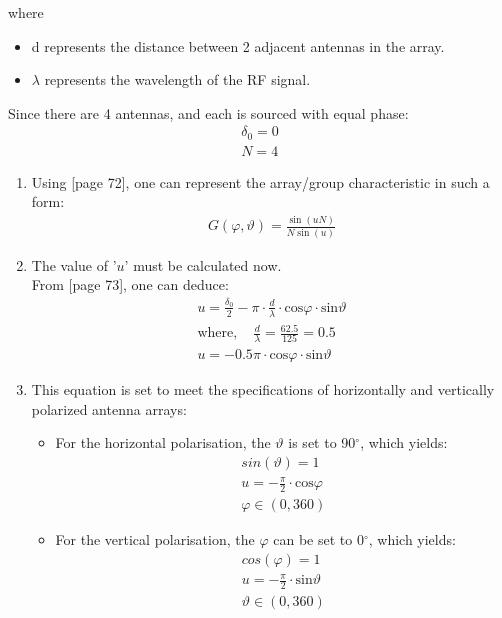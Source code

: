 where\begin{itemize}
	\item d represents the distance between 2 adjacent antennas in the array.
	\item $\lambda$ represents the wavelength of the RF signal.
\end{itemize}
Since there are 4 antennas, and each is sourced with equal phase:
\begin{gather}
	\delta_0=0 \nonumber \\
	N=4	\nonumber
\end{gather}

\begin{enumerate}
	\item Using \cite{lec-script} [page 72], one can represent the array/group characteristic in such a form:
	\begin{gather}
		G(\varphi,\vartheta) = \frac{\sin(uN)}{N\sin(u)} \label{group_char}
	\end{gather}
	
	\item The value of '$u$' must be calculated now.\\ From \cite{lec-script} [page 73], one can deduce:
	\begin{gather}
		u = \frac{\delta_0}{2} - \pi\cdot\frac{d}{\lambda}\cdot\mathrm{cos}\varphi\cdot\mathrm{sin}\vartheta \nonumber \\
		\mathrm{where,}\quad
		\frac{d}{\lambda}=\frac{62.5}{125}=0.5	\nonumber \\
		\boxed{u = - 0.5\pi\cdot\mathrm{cos}\varphi\cdot\mathrm{sin}\vartheta} \label{value_u}
	\end{gather}

	\item This equation is set to meet the specifications of horizontally and vertically polarized antenna arrays:
	\begin{itemize}
		\item For the horizontal polarisation, the $\vartheta$ is set to 90$^\circ$, which yields:
			\begin{gather}
				sin(\vartheta) = 1 \nonumber \\
				u = -\frac{\pi}{2}\cdot\mathrm{cos}\varphi \\
				\varphi \in \mathrm{(0,360)} \nonumber
			\end{gather}

		\item For the vertical polarisation, the $\varphi$ can be set to 0$^\circ$, which yields:
			\begin{gather}
				cos(\varphi) = 1 \nonumber \\
				u = -\frac{\pi}{2}\cdot\mathrm{sin}\vartheta \\
				\vartheta \in \mathrm{(0,360)} \nonumber
			\end{gather}
	\end{itemize}
	

\end{enumerate}
